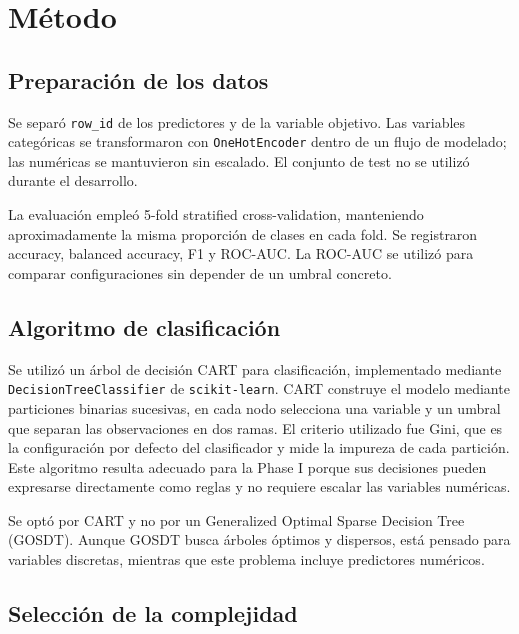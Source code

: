 \chapter{Método} \label{chp:method}


\section{Preparación de los datos}

Se separó \texttt{row_id} de los predictores y de la variable objetivo. Las
variables categóricas se transformaron con \texttt{OneHotEncoder} dentro de un
flujo de modelado; las numéricas se mantuvieron sin escalado. El conjunto de
test no se utilizó durante el desarrollo.

La evaluación empleó 5-fold stratified cross-validation, manteniendo
aproximadamente la misma proporción de clases en cada fold. Se
registraron accuracy, balanced accuracy, F1 y ROC-AUC. La ROC-AUC se utilizó
para comparar configuraciones sin depender de un umbral concreto.

\section{Algoritmo de clasificación}

Se utilizó un árbol de decisión CART para clasificación, implementado mediante
\texttt{DecisionTreeClassifier} de \texttt{scikit-learn}. CART construye el
modelo mediante particiones binarias sucesivas, en cada nodo selecciona una
variable y un umbral que separan las observaciones en dos ramas. El criterio
utilizado fue Gini, que es la configuración por defecto del clasificador y
mide la impureza de cada partición. Este algoritmo resulta adecuado para la
Phase I porque sus decisiones pueden expresarse directamente como reglas y no
requiere escalar las variables numéricas.

Se optó por CART y no por un Generalized Optimal Sparse Decision Tree (GOSDT).
Aunque GOSDT busca árboles óptimos y dispersos, está pensado para variables
discretas, mientras que este problema incluye predictores numéricos.

\section{Selección de la complejidad}

